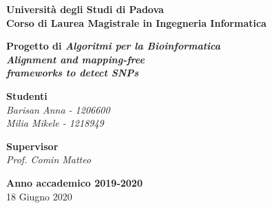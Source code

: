 \documentclass[11pt]{article}
\theoremstyle{definition}
\begin{document}

\begin{titlepage}
   \begin{center}
       	\vspace*{1cm}

	   	\textbf{\Large Università degli Studi di Padova\\}
	   	\vspace{0.2cm}
		\textbf{\Large Corso di Laurea Magistrale in Ingegneria Informatica}

		\vspace{6cm}
		\textbf{\huge Progetto di \textit{Algoritmi per la Bioinformatica}\\}
		\vspace{0.5cm}
      	\textbf{\huge \textit{Alignment and mapping-free \\}}
      	\vspace{0.2cm}
		\textbf{\huge \textit{frameworks to detect SNPs}}     
		 	
       	\vspace{4.5cm}

		\begin{Large}
			\begin{flushright}
				\textbf{Studenti\\}
				\textit{Barisan Anna - 1206600\\ Milia Mikele - 1218949}
			\end{flushright}
		\end{Large}
		
       \begin{Large}
			\begin{flushleft}
				\textbf{Supervisor\\}
				\textit{Prof. Comin Matteo}
			\end{flushleft}
		\end{Large}

       \vfill
       \vspace{0.5cm}
            
       \textbf{Anno accademico 2019-2020}\\
       18 Giugno 2020
            
       \vspace{0.8cm}
    

\end{center}
\end{titlepage}
\end{document}
